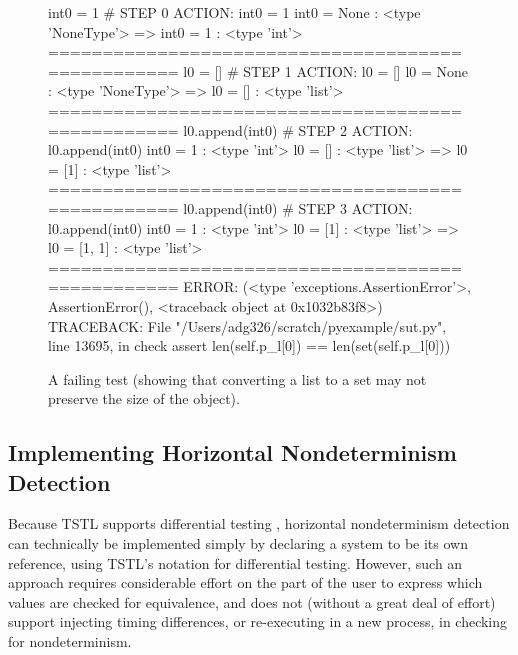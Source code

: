 \begin{figure}
{\scriptsize
\begin{code}
int0 = 1                                                                 \# STEP 0
ACTION: int0 = 1 
int0 = None : <type 'NoneType'>
=> int0 = 1 : <type 'int'>
==================================================
l0 = []                                                                  \# STEP 1
ACTION: l0 = [] 
l0 = None : <type 'NoneType'>
=> l0 = [] : <type 'list'>
==================================================
l0.append(int0)                                                          \# STEP 2
ACTION: l0.append(int0) 
int0 = 1 : <type 'int'>
l0 = [] : <type 'list'>
=> l0 = [1] : <type 'list'>
==================================================
l0.append(int0)                                                          \# STEP 3
ACTION: l0.append(int0) 
int0 = 1 : <type 'int'>
l0 = [1] : <type 'list'>
=> l0 = [1, 1] : <type 'list'>
==================================================
ERROR: (<type 'exceptions.AssertionError'>,
  AssertionError(), <traceback object at 0x1032b83f8>)
TRACEBACK:
  File "/Users/adg326/scratch/pyexample/sut.py",
  line 13695, in check
    assert len(self.p\_l[0]) == len(set(self.p\_l[0]))
\end{code}
}
\caption{A failing test (showing that converting a list to a set may
  not preserve the size of the object).}
\label{fig:setlistfail}
\end{figure}

\subsection{Implementing Horizontal Nondeterminism Detection}

Because TSTL supports differential testing \cite{tstlsttt}, horizontal
nondeterminism detection can technically be implemented simply by
declaring a system to be its own reference, using TSTL's notation for
differential testing.  However, such an approach requires considerable effort
on the part of the user to express which values are checked for
equivalence, and does not (without a great deal of effort) support injecting timing differences,
or re-executing in a new process, in checking for nondeterminism.

